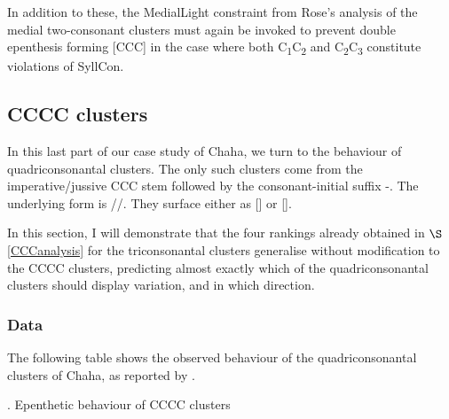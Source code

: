 \documentclass[12pt]{article}
\begin{document}
In addition to these, the {\sc *MedialLight} constraint from Rose's analysis of the medial two-consonant clusters must again be invoked to prevent double epenthesis forming [CCC] in the case where both C\textsubscript{1}C\textsubscript{2} and C\textsubscript{2}C\textsubscript{3} constitute violations of {\sc SyllCon}.


\subsection{CCCC clusters}

In this last part of our case study of Chaha, we turn to the behaviour of quadriconsonantal clusters. The only such clusters come from the imperative/jussive CCC stem followed by the consonant-initial suffix -. The underlying form is //. They surface either as [] or [].

In this section, I will demonstrate that the four rankings already obtained in $\S$\ref{CCCanalysis} for the triconsonantal clusters generalise without modification to the CCCC clusters, predicting almost exactly which of the quadriconsonantal clusters should display variation, and in which direction.

\subsubsection{Data}

The following table shows the observed behaviour of the quadriconsonantal clusters of Chaha, as reported by \cite{rose.2000}.

\ex. Epenthetic behaviour of CCCC clusters
\end{document}
